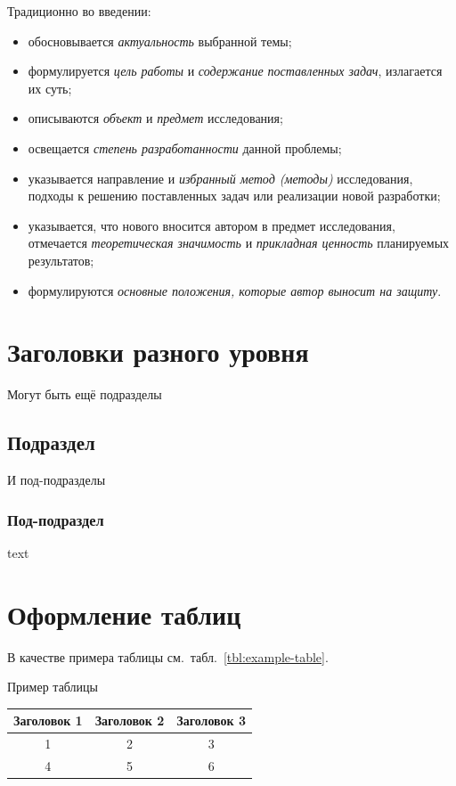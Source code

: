 \documentclass[PI,VKR]{HSEUniversity}
\begin{document}
Традиционно во введении:
\begin{itemize}
	\item  обосновывается \emph{актуальность} выбранной темы;
	\item  формулируется \emph{цель работы} и \emph{содержание поставленных задач}, излагается их суть;
	\item  описываются \emph{объект} и \emph{предмет} исследования;
	\item  освещается \emph{степень разработанности} данной проблемы;
	\item  указывается направление и \emph{избранный метод (методы)} исследования, подходы к решению поставленных задач или реализации новой разработки;
	\item  указывается, что нового вносится автором в предмет исследования, отмечается \emph{теоретическая значимость} и \emph{прикладная ценность} планируемых результатов;
	\item  формулируются \emph{основные положения, которые автор выносит на защиту}.
\end{itemize}

\section{Заголовки разного уровня}

\lipsum[2]

Могут быть ещё подразделы

\subsection{Подраздел}

\lipsum[2]

И под-подразделы

\subsubsection{Под-подраздел}
text

\section{Оформление таблиц} 
%
В качестве примера таблицы см.~табл.~\ref{tbl:example-table}.

\begin{TABLE}[h]{Пример таблицы\label{tbl:example-table}}
	\begin{tabular}{c|cc}
		\hline\hline %
		Заголовок 1 & Заголовок 2 & Заголовок 3 \\ 
		\hline %
		1 & 2 & 3 \\
		4 & 5 & 6 \\
		\hline\hline %
	\end{tabular}
\end{TABLE}
\end{document}
